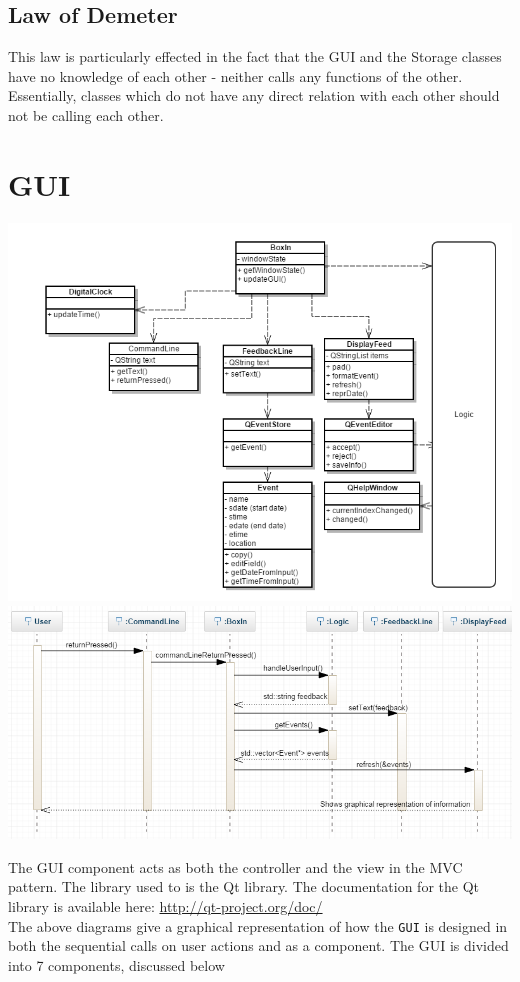 \documentclass[12pt]{extarticle}
\begin{document}
\subsection{Law of Demeter}
This law is particularly effected in the fact that the GUI and the Storage classes have no knowledge of each other - neither calls any functions of the other. Essentially, classes which do not have any direct relation with each other should not be calling each other.

\newpage
\section{GUI}
\includegraphics[width=\textwidth]{GUI_class_diagram}
\includegraphics[width=\textwidth]{gui_sequence_diagram}

\newpage

The GUI component acts as both the controller and the view in the MVC pattern. The library used to is the Qt library. The documentation for the Qt library is available here: \href{http://qt-project.org/doc/}{http://qt-project.org/doc/}\\
The above diagrams give a graphical representation of how the \texttt{GUI} is designed in both the sequential calls on user actions and as a component.
The GUI is divided into 7 components, discussed below
\end{document}
